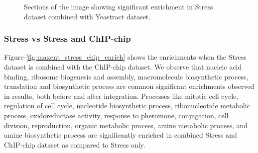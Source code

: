 \begin{figure}[p]
\centering
{}
\caption{Sections of the image showing significant enrichment in Stress dataset combined with Yeastract dataset.}
\label{fig:maxent_stress_yt_enrich}
\end{figure}

\subsubsection{Stress vs Stress and ChIP-chip}
Figure-\ref{fig:maxent_stress_chip_enrich} shows the enrichments when the Stress dataset is combined with the ChIP-chip dataset. We observe that nucleic acid binding, ribosome biogenesis and assembly, macromolecule biosynthetic process, translation and biosynthetic process are 
common significant enrichments observed in results, both before and after integration. Processes like mitotic cell cycle, regulation of cell cycle, nucleotide biosynthetic process, 
ribonucleotide metabolic process, oxidoreductase activity, response to pheromone, conjugation, cell division, reproduction, organic metabolic process, 
amine metabolic process, and amine biosynthetic process are significantly enriched in combined Stress and ChIP-chip dataset as compared to Stress only.

